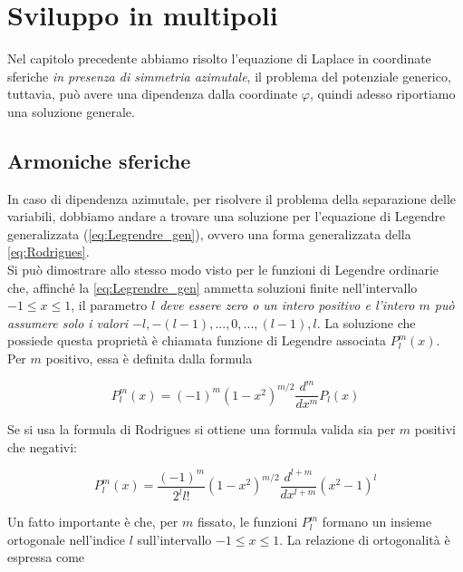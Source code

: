 \chapter{Sviluppo in multipoli}

Nel capitolo precedente abbiamo risolto l'equazione di Laplace in coordinate sferiche \emph{in presenza di simmetria azimutale}, il problema del potenziale generico, tuttavia, può avere una dipendenza dalla coordinate $\varphi$, quindi adesso riportiamo una soluzione generale.

\section{Armoniche sferiche}

In caso di dipendenza azimutale, per risolvere il problema della separazione delle variabili, dobbiamo andare a trovare una soluzione per l'equazione di Legendre generalizzata (\ref{eq:Legrendre_gen}), ovvero una forma generalizzata della \ref{eq:Rodrigues}.\\

Si può dimostrare allo stesso modo visto per le funzioni di Legendre ordinarie che, affinché la \ref{eq:Legrendre_gen} ammetta soluzioni finite nell'intervallo $-1 \leq x \leq 1$, il parametro \emph{$l$ deve essere zero o un intero positivo e l'intero $m$ può assumere solo i valori $-l, -(l-1), ..., 0, ..., (l-1), l$}. La soluzione che possiede questa proprietà è  chiamata funzione di Legendre associata $P_l ^m (x)$.\\

Per $m$ positivo, essa è definita dalla formula 

\begin{equation}
    P_l ^m (x) = (-1)^m (1 - x^2)^{m/2} \frac{d^m}{dx^m} P_l(x)
\end{equation}

Se si usa la formula di Rodrigues si ottiene una formula valida sia per $m$ positivi che negativi:

\begin{tcolorbox}[colback=yellow!10!white, colframe=orange!70!black, boxrule=0.8pt]
\begin{equation}
    P_l^m (x) = \frac{(-1)^m}{2^l l!} (1 - x^2)^{m/2} \frac{d^{l + m}}{dx^{l + m}} (x^2 - 1)^l
\end{equation}
\end{tcolorbox}

Un fatto importante è che, per $m$ fissato, le funzioni $P_l^m$ formano un insieme ortogonale nell'indice $l$ sull'intervallo $-1 \leq x \leq 1$. La relazione di ortogonalità è espressa come 

